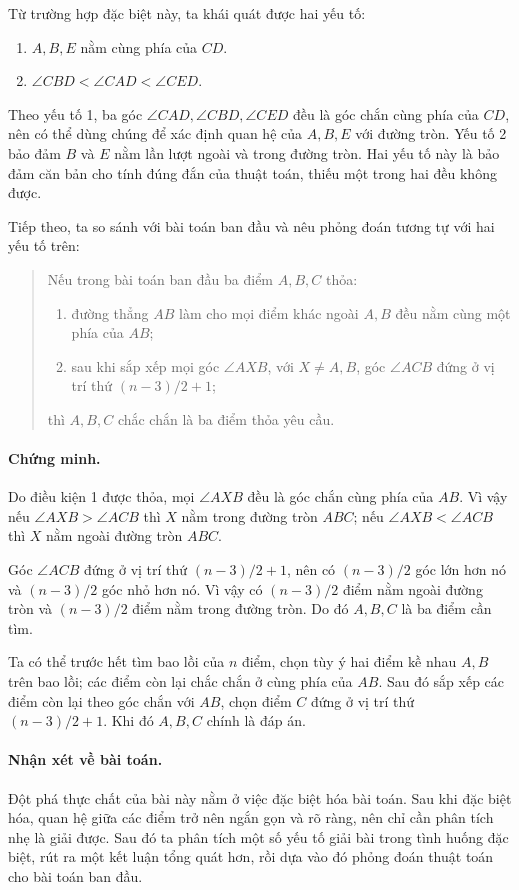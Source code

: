 \documentclass[11pt]{article}
\begin{document}
Từ trường hợp đặc biệt này, ta khái quát được hai yếu tố:
\begin{enumerate}
  \item \(A,B,E\) nằm cùng phía của \(CD\).
  \item \(\angle CBD<\angle CAD<\angle CED\).
\end{enumerate}
Theo yếu tố 1, ba góc \(\angle CAD,\angle CBD,\angle CED\) đều là góc chắn
cùng phía của \(CD\), nên có thể dùng chúng để xác định quan hệ của \(A,B,E\)
với đường tròn. Yếu tố 2 bảo đảm \(B\) và \(E\) nằm lần lượt ngoài và trong
đường tròn. Hai yếu tố này là bảo đảm căn bản cho tính đúng đắn của thuật
toán, thiếu một trong hai đều không được.

Tiếp theo, ta so sánh với bài toán ban đầu và nêu phỏng đoán tương tự với hai
yếu tố trên:

\begin{quote}
Nếu trong bài toán ban đầu ba điểm \(A,B,C\) thỏa:
\begin{enumerate}
  \item đường thẳng \(AB\) làm cho mọi điểm khác ngoài \(A,B\) đều nằm cùng
  một phía của \(AB\);
  \item sau khi sắp xếp mọi góc \(\angle AXB\), với \(X\ne A,B\), góc
  \(\angle ACB\) đứng ở vị trí thứ \((n-3)/2+1\);
\end{enumerate}
thì \(A,B,C\) chắc chắn là ba điểm thỏa yêu cầu.
\end{quote}

\paragraph{Chứng minh.}
Do điều kiện 1 được thỏa, mọi \(\angle AXB\) đều là góc chắn cùng phía của
\(AB\). Vì vậy nếu \(\angle AXB>\angle ACB\) thì \(X\) nằm trong đường tròn
\(ABC\); nếu \(\angle AXB<\angle ACB\) thì \(X\) nằm ngoài đường tròn
\(ABC\).

Góc \(\angle ACB\) đứng ở vị trí thứ \((n-3)/2+1\), nên có \((n-3)/2\) góc
lớn hơn nó và \((n-3)/2\) góc nhỏ hơn nó. Vì vậy có \((n-3)/2\) điểm nằm
ngoài đường tròn và \((n-3)/2\) điểm nằm trong đường tròn. Do đó \(A,B,C\)
là ba điểm cần tìm.

Ta có thể trước hết tìm bao lồi của \(n\) điểm, chọn tùy ý hai điểm kề nhau
\(A,B\) trên bao lồi; các điểm còn lại chắc chắn ở cùng phía của \(AB\). Sau
đó sắp xếp các điểm còn lại theo góc chắn với \(AB\), chọn điểm \(C\) đứng ở
vị trí thứ \((n-3)/2+1\). Khi đó \(A,B,C\) chính là đáp án.

\paragraph{Nhận xét về bài toán.}
Đột phá thực chất của bài này nằm ở việc đặc biệt hóa bài toán. Sau khi đặc
biệt hóa, quan hệ giữa các điểm trở nên ngắn gọn và rõ ràng, nên chỉ cần phân
tích nhẹ là giải được. Sau đó ta phân tích một số yếu tố giải bài trong tình
huống đặc biệt, rút ra một kết luận tổng quát hơn, rồi dựa vào đó phỏng đoán
thuật toán cho bài toán ban đầu.
\end{document}
